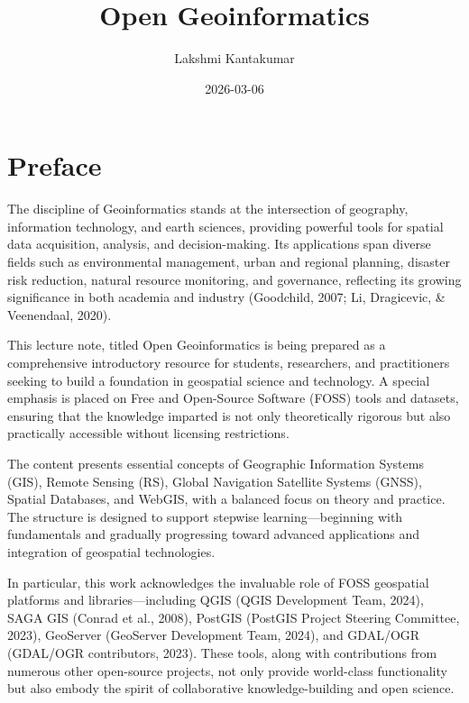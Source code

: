 \documentclass[
  11pt,
  letterpaper,
]{book}
\title{Open Geoinformatics}
\author{Lakshmi Kantakumar}
\date{2026-03-06}
\renewcommand*\contentsname{Table of contents}
\newcommand\contentsname{Table of contents}
\begin{document}
\frontmatter
\maketitle

\renewcommand*\contentsname{Table of contents}
{
\setcounter{tocdepth}{1}
\tableofcontents
}

\mainmatter
{}

\chapter*{Preface}\label{preface}


The discipline of Geoinformatics stands at the intersection of
geography, information technology, and earth sciences, providing
powerful tools for spatial data acquisition, analysis, and
decision-making. Its applications span diverse fields such as
environmental management, urban and regional planning, disaster risk
reduction, natural resource monitoring, and governance, reflecting its
growing significance in both academia and industry (Goodchild, 2007; Li,
Dragicevic, \& Veenendaal, 2020).

This lecture note, titled Open Geoinformatics is being prepared as a
comprehensive introductory resource for students, researchers, and
practitioners seeking to build a foundation in geospatial science and
technology. A special emphasis is placed on Free and Open-Source
Software (FOSS) tools and datasets, ensuring that the knowledge imparted
is not only theoretically rigorous but also practically accessible
without licensing restrictions.

The content presents essential concepts of Geographic Information
Systems (GIS), Remote Sensing (RS), Global Navigation Satellite Systems
(GNSS), Spatial Databases, and WebGIS, with a balanced focus on theory
and practice. The structure is designed to support stepwise
learning---beginning with fundamentals and gradually progressing toward
advanced applications and integration of geospatial technologies.

In particular, this work acknowledges the invaluable role of FOSS
geospatial platforms and libraries---including QGIS (QGIS Development
Team, 2024), SAGA GIS (Conrad et al., 2008), PostGIS (PostGIS Project
Steering Committee, 2023), GeoServer (GeoServer Development Team, 2024),
and GDAL/OGR (GDAL/OGR contributors, 2023). These tools, along with
contributions from numerous other open-source projects, not only provide
world-class functionality but also embody the spirit of collaborative
knowledge-building and open science.
\end{document}
